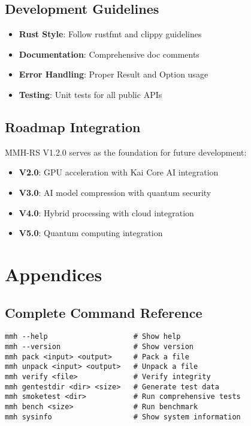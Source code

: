 \documentclass[12pt,a4paper]{article}
\begin{document}
\subsection{Development Guidelines}
\begin{itemize}
    \item \textbf{Rust Style}: Follow rustfmt and clippy guidelines
    \item \textbf{Documentation}: Comprehensive doc comments
    \item \textbf{Error Handling}: Proper Result and Option usage
    \item \textbf{Testing}: Unit tests for all public APIs
\end{itemize}

\subsection{Roadmap Integration}
MMH-RS V1.2.0 serves as the foundation for future development:

\begin{itemize}
    \item \textbf{V2.0}: GPU acceleration with Kai Core AI integration
    \item \textbf{V3.0}: AI model compression with quantum security
    \item \textbf{V4.0}: Hybrid processing with cloud integration
    \item \textbf{V5.0}: Quantum computing integration
\end{itemize}

\newpage

\section{Appendices}

\subsection{Complete Command Reference}
\begin{lstlisting}[caption=Complete Command Reference]
mmh --help                    # Show help
mmh --version                 # Show version
mmh pack <input> <output>     # Pack a file
mmh unpack <input> <output>   # Unpack a file
mmh verify <file>             # Verify integrity
mmh gentestdir <dir> <size>   # Generate test data
mmh smoketest <dir>           # Run comprehensive tests
mmh bench <size>              # Run benchmark
mmh sysinfo                   # Show system information
\end{lstlisting}
\end{document}

